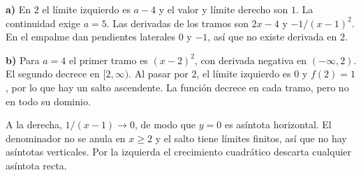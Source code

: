 \textbf{a)} En $2$ el límite izquierdo es $a-4$ y el valor
y límite derecho son $1$. La continuidad exige $\boxed{a=5}$.
Las derivadas de los tramos son $2x-4$ y $-1/(x-1)^2$.
En el empalme dan pendientes laterales $0$ y $-1$, así que
no existe derivada en $2$.

\textbf{b)} Para $a=4$ el primer tramo es $(x-2)^2$, con
derivada negativa en $(-\infty,2)$. El segundo decrece en
$[2,\infty)$. Al pasar por $2$, el límite izquierdo es $0$
y $f(2)=1$, por lo que hay un salto ascendente. La función
decrece en cada tramo, pero no en todo su dominio.

A la derecha, $1/(x-1)\to0$, de modo que $y=0$ es asíntota
horizontal. El denominador no se anula en $x\ge2$ y el salto
tiene límites finitos, así que no hay asíntotas verticales.
Por la izquierda el crecimiento cuadrático descarta cualquier
asíntota recta.
